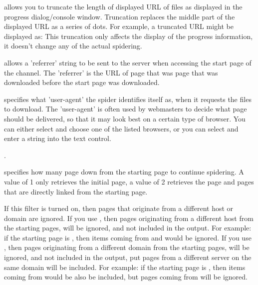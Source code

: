  allows you to truncate the length of displayed URL of files as
displayed in the progress dialog/console window. Truncation replaces the
middle part of the displayed URL as a series of dots. For example, a
truncated URL might be displayed as:
This truncation only affects the display of the progress information,
it doesn't change any of the actual spidering.

 allows a 'referrer' string to be sent
to the server when accessing the start page of the channel. The 'referrer' is
the URL of page that was page that was downloaded before the start page was
downloaded.

 specifies what 'user-agent' the spider identifies itself as,
when it requests the files to download. The 'user-agent' is often used by
webmasters to decide what page should be delivered, so that it may look best
on a certain type of browser. You can either select
 and choose one of the listed browsers, or
you can select 
and enter a string into the text control.

.


 specifies how many page down from the starting
page to continue spidering. A value of 1 only retrieves the initial page, a
value of 2 retrieves the page and pages that are directly linked from the
starting page.

 If this filter is turned
on, then pages that originate from a different host or domain are ignored.
If you use , then pages originating from a
different host from the starting pages, will be ignored, and not included in
the output. For example: if the starting page is
, then items coming from
 and  would be ignored.
If you use , then pages originating from a
different domain from the starting pages, will be ignored, and not included in
the output, put pages from a different server on the same domain will be
included. For example: if the starting page is
, then items coming from
 would be also be included, but pages coming 
from  will be ignored.

